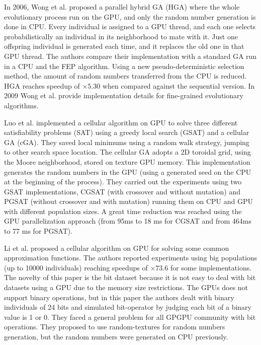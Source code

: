 \documentclass[review]{elsarticle}
\begin{document}
In 2006, Wong et al. \cite{man-leung-wong-parallel-2006} proposed a parallel hybrid GA (HGA) where the whole evolutionary process run on the GPU, and only the random number generation is done in CPU. Every individual is assigned to a GPU thread, and each one selects probabilistically an individual in its neighborhood to mate with it. Just one offspring individual is generated each time, and it replaces the old one in that GPU thread. The authors compare their implementation with a standard GA run in a CPU and the FEP \cite{man-leung-wong-parallel-2005} algorithm. Using a new pseudo-deterministic selection method, the amount of random numbers transferred from the CPU is reduced. HGA reaches speedup of $\times5.30$ when compared against the sequential version. In 2009 Wong et al. \cite{wong-implementation-2009} provide implementation details for fine-grained evolutionary algorithms.  

Luo et al. \cite{zhongwen-luo-cellular-2006} implemented a cellular algorithm on GPU to solve three different satisfiability problems (SAT) 
using a greedy local search (GSAT) \cite{Selman93domain-independentextensions} and a cellular GA (cGA). 
They saved local minimums using a random walk strategy, jumping to other search space location. 
The cellular GA adopts a 2D toroidal grid, using the Moore neighborhood, stored on texture GPU memory. This implementation generates the random numbers in the GPU (using a generated seed on the CPU at the beginning of the process). They carried out the experiments using two GSAT implementations, CGSAT (with crossover and without mutation) and PGSAT (without crossover and with mutation) running them on CPU and GPU with different population sizes. A great time reduction was reached using the GPU parallelization approach (from 95ms to 18 ms for CGSAT and from 464ms to 77 ms for PGSAT).

Li et al. \cite{jian_ming_li_efficient_2007} proposed a cellular algorithm on GPU for solving some common approximation functions. The authors reported experiments using big populations (up to 10000 individuals) reaching speedups of $\times73.6$ for some implementations. The novelty of this paper is the bit dataset because it is not easy to deal with bit datasets using a GPU due to the memory size restrictions. The GPUs does not support binary operations, but in this paper the authors dealt with binary individuals of 24 bits  and simulated bit-operator by judging each bit of a binary value is 1 or 0. They faced a general problem for all GPGPU community with bit operations. They proposed to use random-textures for random numbers generation, but the random numbers were generated on CPU previously. 
\end{document}
